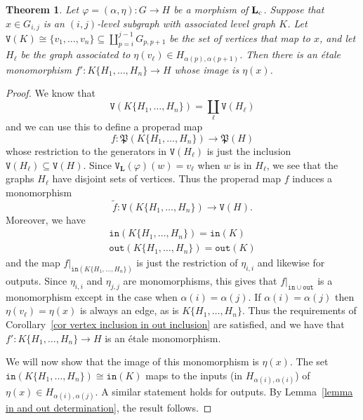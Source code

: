 \documentclass{amsart}
\newtheorem{theorem}{Theorem}
\numberwithin{theorem}{subsection}
\theoremstyle{definition}
\newcommand{\name}[1]{\ensuremath{\text{\textup{#1}}}}
\newcommand{\levelg}{\mathbf{L}}
\newcommand{\levelgconn}{\levelg_{\name{c}}}
\newcommand{\out}{\mathtt{out}}
\newcommand{\inp}{\mathtt{in}}
\newcommand{\vertex}{\mathtt{V}}
\begin{document}
\begin{theorem}\label{theorem on levelgconn to etale mono}
Let $\varphi = (\alpha, \eta): G \to H$ be a morphism of $\levelgconn$.
Suppose that $x\in G_{i,j}$ is an $(i,j)$-level subgraph with associated level graph $K$.
Let $\vertex(K) \cong \{v_1, \dots, v_n\} \subseteq \coprod_{p = i}^{j-1} G_{p,p+1}$ be the set of vertices that map to $x$, and let $H_\ell$ be the graph associated to $\eta(v_\ell) \in H_{\alpha(p),\alpha(p+1)}$.
Then there is an \'etale monomorphism $f' : K\{H_1, \dots, H_n\} \to H$ whose image is $\eta(x)$.
\end{theorem}

\begin{proof}
We know that
\[
	\vertex(K\{H_1, \dots, H_n\}) = \coprod_\ell \vertex(H_\ell)
\]
and we can use this to define a properad map
\[
	f : \mathfrak{P}(K\{H_1, \dots, H_n\}) \to \mathfrak{P}(H)
\]
whose restriction to the generators in $\vertex(H_\ell)$ is just the inclusion $\vertex(H_\ell) \subseteq \vertex(H)$.
Since $\vertex_{\levelg}(\varphi)(w) = v_\ell$ when $w$ is in $H_\ell$, we see that the graphs $H_\ell$ have disjoint sets of vertices.
Thus the properad map $f$ induces a monomorphism
\[
	\widetilde f : \vertex(K\{H_1, \dots, H_n\}) \to \vertex(H).
\]
Moreover, we have
\begin{gather*}
	\inp(K\{H_1, \dots, H_n\}) = \inp(K) \\
	\out(K\{H_1, \dots, H_n\}) = \out(K)
\end{gather*}
and the map $f|_{\inp(K\{H_1, \dots, H_n\})}$ is just the restriction of $\eta_{i,i}$ and likewise for outputs.
Since $\eta_{i,i}$ and $\eta_{j,j}$ are monomorphisms, this gives that $f|_{\inp \cup \out}$ is a monomorphism except in the case when $\alpha(i) = \alpha(j)$.
If $\alpha(i) = \alpha(j)$ then $\eta(v_\ell) = \eta(x)$ is always an edge, as is $K\{H_1, \dots, H_n\}$.
Thus the requirements of Corollary~\ref{cor vertex inclusion in out inclusion} are satisfied, and we have that $f' : K\{H_1, \dots, H_n\} \to H$ is an \'etale monomorphism.

We will now show that the image of this monomorphism is $\eta(x)$.
The set $\inp(K\{H_1, \dots, H_n \}) \cong \inp(K)$ maps to the inputs (in $H_{\alpha(i),\alpha(i)}$) of $\eta(x) \in H_{\alpha(i),\alpha(j)}$. 
A similar statement holds for outputs.
By Lemma~\ref{lemma in and out determination}, the result follows.
\end{proof}
\end{document}
